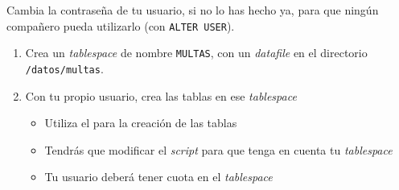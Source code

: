 \begin{homeworkProblem}
  Cambia la contraseña de tu usuario, si no lo has hecho ya, para que ningún compañero pueda utilizarlo (con \texttt{ALTER USER}).

  \begin{enumerate}
  \item Crea un \textit{tablespace} de nombre \texttt{MULTAS}, con un \textit{datafile} en el directorio \texttt{/datos/multas}.
  \item Con tu propio usuario, crea las tablas en ese \textit{tablespace}
    \begin{itemize}
    \item Utiliza el  para la creación de las tablas
    \item Tendrás que modificar el \textit{script} para que tenga en cuenta tu \textit{tablespace}
    \item Tu usuario deberá tener cuota en el \textit{tablespace}
    \end{itemize}
  \end{enumerate}
\end{homeworkProblem}

